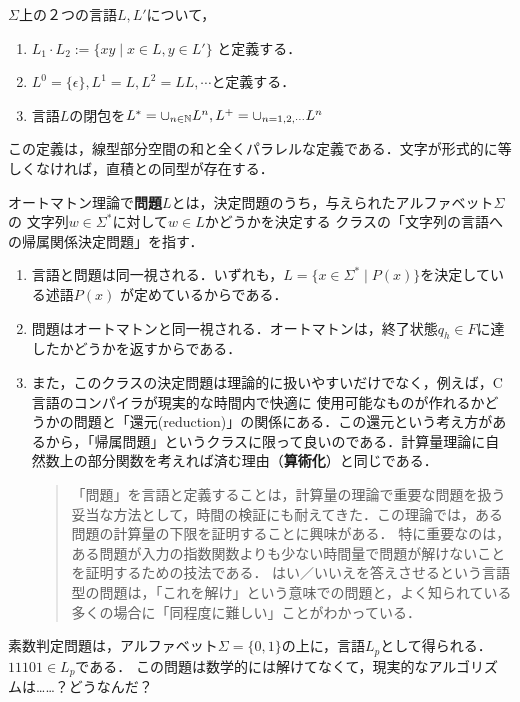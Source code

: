 \documentclass[uplatex, dvipdfmx]{jsreport}
\begin{document}
\begin{definition}
    $\Sigma$上の２つの言語$L,L'$について，
    \begin{enumerate}
        \item $L_1\cdot L_2:=\{xy\mid x\in L,y\in L'\}$
        と定義する．
        \item $L^0=\{\epsilon\}, L^1=L,L^2=LL,\cdots$と定義する．
        \item 言語$L$の閉包を$L^*=\cup_{n\in\mathbb{N}}L^n, L^+=\cup_{n=1,2,\cdots}L^n$
    \end{enumerate}
\end{definition}
\begin{remark}
    この定義は，線型部分空間の和と全くパラレルな定義である．文字が形式的に等しくなければ，直積との同型が存在する．
\end{remark}

\begin{definition}[problem]
    オートマトン理論で\textbf{問題}$L$とは，決定問題のうち，与えられたアルファベット$\Sigma$の
    文字列$w\in\Sigma^*$に対して$w\in L$かどうかを決定する
    クラスの「文字列の言語への帰属関係決定問題」を指す．
\end{definition}
\begin{remark}\mbox{}
    \begin{enumerate}
        \item 言語と問題は同一視される．いずれも，$L=\{x\in\Sigma^*\mid P(x)\}$を決定している述語$P(x)$
        が定めているからである．
        \item 問題はオートマトンと同一視される．オートマトンは，終了状態$q_h\in F$に達したかどうかを返すからである．
        \item また，このクラスの決定問題は理論的に扱いやすいだけでなく，例えば，C言語のコンパイラが現実的な時間内で快適に
        使用可能なものが作れるかどうかの問題と「還元(reduction)」の関係にある．この還元という考え方があるから，「帰属問題」というクラスに限って良いのである．計算量理論に自然数上の部分関数を考えれば済む理由（\textbf{算術化}）と同じである．
        \begin{quotation}
            「問題」を言語と定義することは，計算量の理論で重要な問題を扱う妥当な方法として，時間の検証にも耐えてきた．この理論では，ある問題の計算量の下限を証明することに興味がある．
            特に重要なのは，ある問題が入力の指数関数よりも少ない時間量で問題が解けないことを証明するための技法である．
            はい／いいえを答えさせるという言語型の問題は，「これを解け」という意味での問題と，よく知られている多くの場合に「同程度に難しい」ことがわかっている．
        \end{quotation}
    \end{enumerate}
\end{remark}
\begin{example}
    素数判定問題は，アルファベット$\Sigma=\{0,1\}$の上に，言語$L_p$として得られる．$11101\in L_p$である．
    この問題は数学的には解けてなくて，現実的なアルゴリズムは……？どうなんだ？
\end{example}
\end{document}
